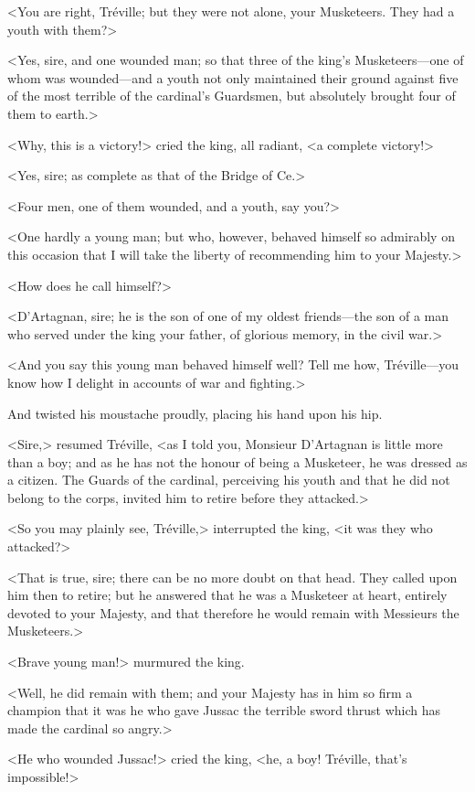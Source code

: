 <You are right, Tréville; but they were not alone, your Musketeers. They had a youth with them?> 

<Yes, sire, and one wounded man; so that three of the king's Musketeers—one of whom was wounded—and a youth not only maintained their ground against five of the most terrible of the cardinal's Guardsmen, but absolutely brought four of them to earth.> 

<Why, this is a victory!> cried the king, all radiant, <a complete victory!> 

<Yes, sire; as complete as that of the Bridge of Ce.> 

<Four men, one of them wounded, and a youth, say you?> 

<One hardly a young man; but who, however, behaved himself so admirably on this occasion that I will take the liberty of recommending him to your Majesty.> 

<How does he call himself?> 

<D'Artagnan, sire; he is the son of one of my oldest friends—the son of a man who served under the king your father, of glorious memory, in the civil war.> 

<And you say this young man behaved himself well? Tell me how, Tréville—you know how I delight in accounts of war and fighting.> 

And  twisted his moustache proudly, placing his hand upon his hip. 

<Sire,> resumed Tréville, <as I told you, Monsieur D'Artagnan is little more than a boy; and as he has not the honour of being a Musketeer, he was dressed as a citizen. The Guards of the cardinal, perceiving his youth and that he did not belong to the corps, invited him to retire before they attacked.> 

<So you may plainly see, Tréville,> interrupted the king, <it was they who attacked?> 

<That is true, sire; there can be no more doubt on that head. They called upon him then to retire; but he answered that he was a Musketeer at heart, entirely devoted to your Majesty, and that therefore he would remain with Messieurs the Musketeers.> 

<Brave young man!> murmured the king. 

<Well, he did remain with them; and your Majesty has in him so firm a champion that it was he who gave Jussac the terrible sword thrust which has made the cardinal so angry.> 

<He who wounded Jussac!> cried the king, <he, a boy! Tréville, that's impossible!> 


